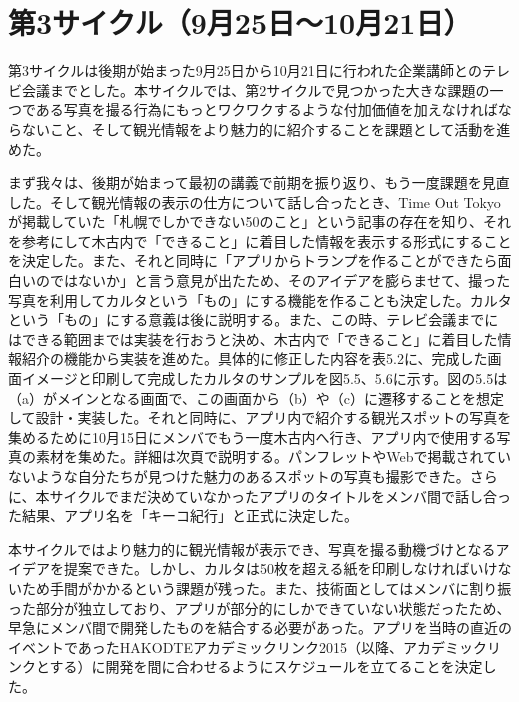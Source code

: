 \section{第3サイクル（9月25日〜10月21日）}
第3サイクルは後期が始まった9月25日から10月21日に行われた企業講師とのテレビ会議までとした。本サイクルでは、第2サイクルで見つかった大きな課題の一つである写真を撮る行為にもっとワクワクするような付加価値を加えなければならないこと、そして観光情報をより魅力的に紹介することを課題として活動を進めた。
\par まず我々は、後期が始まって最初の講義で前期を振り返り、もう一度課題を見直した。そして観光情報の表示の仕方について話し合ったとき、Time Out Tokyo\cite{TIMEOUTTOKYO}が掲載していた「札幌でしかできない50のこと」という記事の存在を知り、それを参考にして木古内で「できること」に着目した情報を表示する形式にすることを決定した。また、それと同時に「アプリからトランプを作ることができたら面白いのではないか」と言う意見が出たため、そのアイデアを膨らませて、撮った写真を利用してカルタという「もの」にする機能を作ることも決定した。カルタという「もの」にする意義は後に説明する。また、この時、テレビ会議までにはできる範囲までは実装を行おうと決め、木古内で「できること」に着目した情報紹介の機能から実装を進めた。具体的に修正した内容を表5.2に、完成した画面イメージと印刷して完成したカルタのサンプルを図5.5、5.6に示す。図の5.5は（a）がメインとなる画面で、この画面から（b）や（c）に遷移することを想定して設計・実装した。それと同時に、アプリ内で紹介する観光スポットの写真を集めるために10月15日にメンバでもう一度木古内へ行き、アプリ内で使用する写真の素材を集めた。詳細は次頁で説明する。パンフレットやWebで掲載されていないような自分たちが見つけた魅力のあるスポットの写真も撮影できた。さらに、本サイクルでまだ決めていなかったアプリのタイトルをメンバ間で話し合った結果、アプリ名を「キーコ紀行」と正式に決定した。
\par 本サイクルではより魅力的に観光情報が表示でき、写真を撮る動機づけとなるアイデアを提案できた。しかし、カルタは50枚を超える紙を印刷しなければいけないため手間がかかるという課題が残った。また、技術面としてはメンバに割り振った部分が独立しており、アプリが部分的にしかできていない状態だったため、早急にメンバ間で開発したものを結合する必要があった。アプリを当時の直近のイベントであったHAKODTEアカデミックリンク2015（以降、アカデミックリンクとする）に開発を間に合わせるようにスケジュールを立てることを決定した。\newpage

